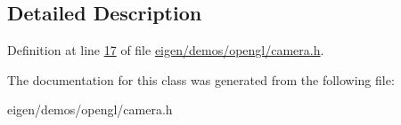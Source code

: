\subsection{Detailed Description}


Definition at line \hyperlink{eigen_2demos_2opengl_2camera_8h_source_l00017}{17} of file \hyperlink{eigen_2demos_2opengl_2camera_8h_source}{eigen/demos/opengl/camera.\+h}.



The documentation for this class was generated from the following file\+:\begin{DoxyCompactItemize}
\item 
eigen/demos/opengl/camera.\+h\end{DoxyCompactItemize}
